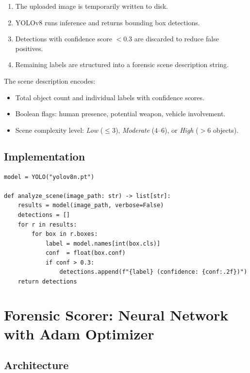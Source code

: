 \documentclass[12pt,a4paper]{article}
\begin{document}
\begin{enumerate}
  \item The uploaded image is temporarily written to disk.
  \item YOLOv8 runs inference and returns bounding box detections.
  \item Detections with confidence score $< 0.3$ are discarded to reduce false positives.
  \item Remaining labels are structured into a forensic scene description string.
\end{enumerate}

The scene description encodes:
\begin{itemize}
  \item Total object count and individual labels with confidence scores.
  \item Boolean flags: human presence, potential weapon, vehicle involvement.
  \item Scene complexity level: \textit{Low} ($\le3$), \textit{Moderate} ($4$--$6$),
        or \textit{High} ($>6$ objects).
\end{itemize}

\subsection{Implementation}

\begin{lstlisting}[style=pythonstyle, caption={YOLOv8 Inference (vision.py)}]
model = YOLO("yolov8n.pt")

def analyze_scene(image_path: str) -> list[str]:
    results = model(image_path, verbose=False)
    detections = []
    for r in results:
        for box in r.boxes:
            label = model.names[int(box.cls)]
            conf  = float(box.conf)
            if conf > 0.3:
                detections.append(f"{label} (confidence: {conf:.2f})")
    return detections
\end{lstlisting}

\section{Forensic Scorer: Neural Network with Adam Optimizer}

\subsection{Architecture}
\end{document}
